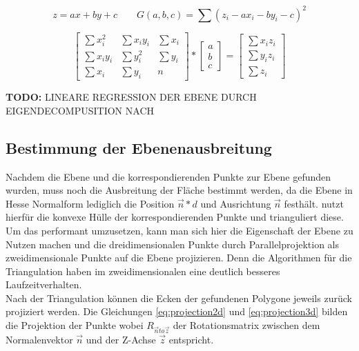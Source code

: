 \begin{equation} \label{eq:least-squares}
z = ax + by + c   \qquad G(a, b, c) = \sum {\left(z_i - ax_i - by_i - c\right)}^2
\end{equation}

\begin{equation} \label{eq:least-squares-solution}
\begin{bmatrix}
\sum x_i^2 & \sum x_iy_i & \sum x_i\\ 
\sum x_iy_i  & \sum y_i^2  & \sum y_i \\ 
\sum x_i & \sum y_i  & n
\end{bmatrix}
*
\begin{bmatrix}
a\\ 
b\\ 
c
\end{bmatrix}
=
\begin{bmatrix}
\sum x_iz_i\\ 
\sum y_iz_i\\ 
\sum z_i
\end{bmatrix}
\end{equation}

\textbf{TODO: }LINEARE REGRESSION DER EBENE DURCH EIGENDECOMPUSITION NACH \citet{hoppe1992surface}

\subsection{Bestimmung der Ebenenausbreitung}

Nachdem die Ebene und die korrespondierenden Punkte zur Ebene gefunden wurden, muss noch die Ausbreitung der Fläche bestimmt werden, da die Ebene in Hesse Normalform lediglich die Position \(\vec{n} * d\) und Ausrichtung \(\vec{n}\) festhält. \citet{PlanarSurfaceMapping} nutzt hierfür die konvexe Hülle der korrespondierenden Punkte und trianguliert diese. Um das performant umzusetzen, kann man sich hier die Eigenschaft der Ebene zu Nutzen machen und die dreidimensionalen Punkte durch Parallelprojektion als zweidimensionale Punkte auf die Ebene projizieren. Denn die Algorithmen für die Triangulation haben im zweidimensionalen eine deutlich besseres Laufzeitverhalten. \\

Nach der Triangulation können die Ecken der gefundenen Polygone jeweils zurück projiziert werden. Die Gleichungen \ref{eq:projection2d} und \ref{eq:projection3d} bilden die Projektion der Punkte wobei \(R_{\vec{n}to\vec{z}}\) der Rotationsmatrix zwischen dem Normalenvektor \(\vec{n}\) und der Z-Achse \(\vec{z}\) entspricht.\\

